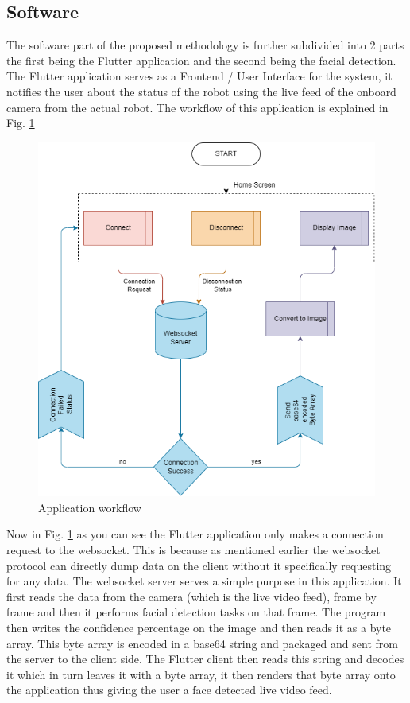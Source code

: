 \documentclass[journal]{IEEEtran}
\begin{document}
\subsection{Software}
The software part of the proposed methodology is further subdivided
into 2 parts the first being the Flutter application and the second
being the facial detection. The Flutter application serves as a
Frontend / User Interface for the system, it notifies the user
about the status of the robot using the live feed of the onboard
camera from the actual robot. The workflow of this application
is explained in Fig. \ref{workflow}
\begin{figure}[!ht]
	\centering
	\includegraphics[width=\linewidth]{./img/flutter_implementation.png}
	\caption{Application workflow}
	\label{workflow}
\end{figure}
Now in Fig. \ref{workflow} as you can see the Flutter application
only makes a connection request to the websocket. This is because
as mentioned earlier the websocket protocol can directly dump
data on the client without it specifically requesting for any data.
The websocket server serves a simple purpose in this application.
It first reads the data from the camera (which is the live video
feed), frame by frame and then it performs facial detection tasks
on that frame. The program then writes the confidence percentage
on the image and then reads it as a byte array. This byte array
is encoded in a base64 string and packaged and sent from the
server to the client side. The Flutter client then reads this
string and decodes it which in turn leaves it with a byte array,
it then renders that byte array onto the application thus giving
the user a face detected live video feed.
\end{document}
